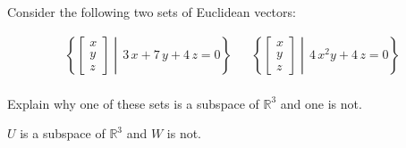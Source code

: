 
\begin{exerciseStatement}


Consider the following two sets of Euclidean vectors: 


\begin{align*}  \left\{ \left[\begin{array}{c}
x \\
y \\
z
\end{array}\right] \middle|\,3 \, x + 7 \, y + 4 \, z = 0\right\}  & &   \left\{ \left[\begin{array}{c}
x \\
y \\
z
\end{array}\right] \middle|\,4 \, x^{2} y + 4 \, z = 0\right\}  \\ \end{align*}
            

 Explain why one of these sets is a subspace of \(\mathbb{R}^ 3 \) and one is not. 


\end{exerciseStatement}
    
\begin{exerciseAnswer} 


\(U\) is a subspace of \(\mathbb{R}^ 3 \) and \(W\) is not.


\end{exerciseAnswer}
    
